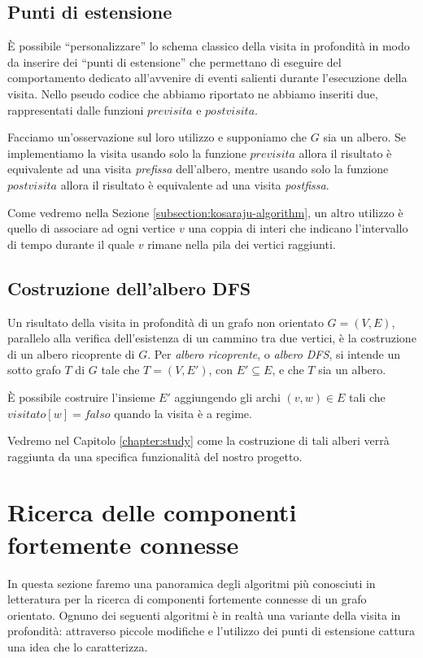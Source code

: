 \subsection{Punti di estensione}
\`E possibile ``personalizzare'' lo schema classico della visita in
profondit\`a in modo da inserire dei ``punti di estensione'' che
permettano di eseguire del comportamento dedicato all'avvenire di
eventi salienti durante l'esecuzione della visita. Nello pseudo codice
che abbiamo riportato ne abbiamo inseriti due, rappresentati dalle
funzioni $previsita$ e $postvisita$.

Facciamo un'osservazione sul loro utilizzo e supponiamo che $G$ sia un
albero. Se implementiamo la visita usando solo la funzione $previsita$
allora il risultato \`e equivalente ad una visita \emph{prefissa}
dell'albero, mentre usando solo la funzione $postvisita$ allora
il risultato \`e equivalente ad una visita \emph{postfissa}.

Come vedremo nella Sezione \ref{subsection:kosaraju-algorithm}, un
altro utilizzo \`e quello di associare ad ogni vertice $v$ una coppia
di interi che indicano l'intervallo di tempo durante il quale $v$
rimane nella pila dei vertici raggiunti.

\subsection{Costruzione dell'albero DFS}
Un risultato della visita in profondit\`a di un grafo non orientato $G
= (V, E)$, parallelo alla verifica dell'esistenza di un cammino tra
due vertici, \`e la costruzione di un albero ricoprente di $G$. Per
\emph{albero ricoprente}, o \emph{albero DFS}, si intende un
sotto grafo $T$ di $G$ tale che $T = (V, E')$, con $E' \subseteq E$, e
che $T$ sia un albero.

\`E possibile costruire l'insieme $E'$ aggiungendo gli archi $(v, w)
\in E$ tali che $visitato[w] = falso$ quando la visita \`e a regime.

Vedremo nel Capitolo \ref{chapter:study} come la costruzione di tali
alberi verr\`a raggiunta da una specifica funzionalit\`a del nostro
progetto.

\section{Ricerca delle componenti fortemente connesse}

In questa sezione faremo una panoramica degli algoritmi pi\`u
conosciuti in letteratura per la ricerca di componenti fortemente
connesse di un grafo orientato. Ognuno dei seguenti algoritmi \`e in
realt\`a una variante della visita in profondit\`a: attraverso piccole
modifiche e l'utilizzo dei punti di estensione cattura una idea che lo
caratterizza.

